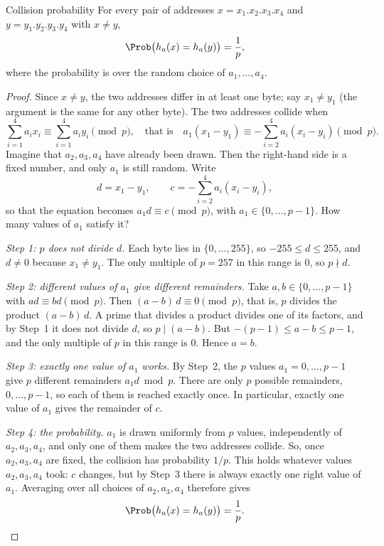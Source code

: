 \documentclass[a4paper,12pt,oneside]{report}
\begin{document}
\begin{framedprop}{Collision probability}\label{prop:universal-ip}
For every pair of addresses $x=x_1.x_2.x_3.x_4$ and
$y=y_1.y_2.y_3.y_4$ with $x\neq y$,
\[
  \Prob\bigl(h_a(x)=h_a(y)\bigr)=\frac{1}{p},
\]
where the probability is over the random choice of
$a_1,\ldots,a_4$.
\end{framedprop}

\begin{proof}
Since $x\neq y$, the two addresses differ in at least one byte; say
$x_1\neq y_1$ (the argument is the same for any other byte). The two
addresses collide when
\[
  \sum_{i=1}^{4}a_ix_i\equiv\sum_{i=1}^{4}a_iy_i \pmod p,
  \quad\text{that is}\quad
  a_1(x_1-y_1)\equiv-\sum_{i=2}^{4}a_i(x_i-y_i) \pmod p.
\]
Imagine that $a_2,a_3,a_4$ have already been drawn. Then the right-hand
side is a fixed number, and only $a_1$ is still random. Write
\[
  d=x_1-y_1,\qquad c=-\sum_{i=2}^{4}a_i(x_i-y_i),
\]
so that the equation becomes $a_1d\equiv c\pmod p$, with
$a_1\in\{0,\ldots,p-1\}$. How many values of $a_1$ satisfy it?

\emph{Step 1: $p$ does not divide $d$.} Each byte lies in
$\{0,\ldots,255\}$, so $-255\leq d\leq255$, and $d\neq0$ because
$x_1\neq y_1$. The only multiple of $p=257$ in this range is $0$, so
$p\nmid d$.

\emph{Step 2: different values of $a_1$ give different remainders.}
Take $a,b\in\{0,\ldots,p-1\}$ with $ad\equiv bd\pmod p$. Then
$(a-b)\,d\equiv0\pmod p$, that is, $p$ divides the product
$(a-b)\,d$. A prime that divides a product divides one of its factors,
and by Step~1 it does not divide $d$, so $p\mid(a-b)$. But
$-(p-1)\leq a-b\leq p-1$, and the only multiple of $p$ in this range
is $0$. Hence $a=b$.

\emph{Step 3: exactly one value of $a_1$ works.} By Step~2, the $p$
values $a_1=0,\ldots,p-1$ give $p$ different remainders $a_1d\bmod p$.
There are only $p$ possible remainders, $0,\ldots,p-1$, so each of
them is reached exactly once. In particular, exactly one value of
$a_1$ gives the remainder of $c$.

\emph{Step 4: the probability.} $a_1$ is drawn uniformly from $p$
values, independently of $a_2,a_3,a_4$, and only one of them makes the
two addresses collide. So, once $a_2,a_3,a_4$ are fixed, the collision
has probability $1/p$. This holds whatever values $a_2,a_3,a_4$ took:
$c$ changes, but by Step~3 there is always exactly one right value of
$a_1$. Averaging over all choices of $a_2,a_3,a_4$ therefore gives
\[
  \Prob\bigl(h_a(x)=h_a(y)\bigr)=\frac1p.\qedhere
\]
\end{proof}
\end{document}
